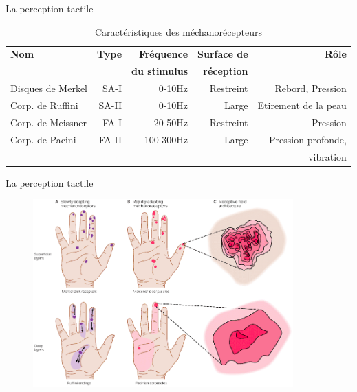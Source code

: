 \documentclass[compress, noflama]{beamer}
\begin{document}
\begin{frame}{La perception tactile}
\begin{table}[]
\centering
\footnotesize
	\begin{tabular}[]{lrrrr}
		\toprule
		\textbf{Nom}			& \textbf{Type}	
		                    & \textbf{Fréquence} & \textbf{Surface de} 
		                    & \textbf{Rôle} \\
		                    & & \textbf{du stimulus} & \textbf{réception} &\\
		\midrule
		Disques de Merkel				& SA-I	& 0-10Hz	& Restreint & Rebord, Pression		\\[0.25em]
		Corp. de Ruffini				& SA-II	& 0-10Hz	& Large & Etirement de la peau	\\[0.25em]
		Corp. de Meissner					& FA-I	& 20-50Hz	& Restreint & Pression	\\[0.25em]
		Corp. de Pacini				& FA-II	& 100-300Hz	& Large & Pression profonde,\\
		& & & & vibration\\
		\bottomrule
	\end{tabular}
	\caption{Caractéristiques des méchanorécepteurs}
\end{table}
\end{frame}

{
\begin{frame}{La perception tactile}
\begin{figure}
\centering
\includegraphics[width=10cm]{images/mechanoreceptors}
\end{figure}
\end{frame}
}
\end{document}
